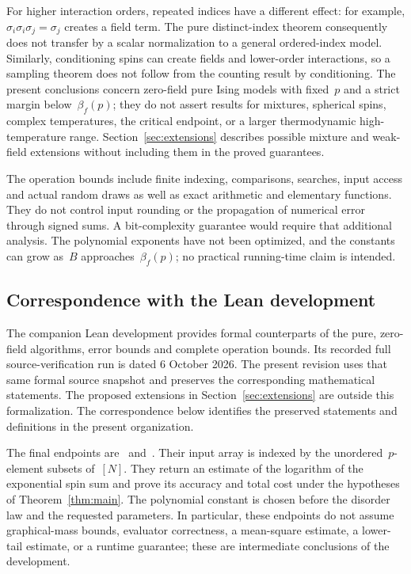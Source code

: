 \documentclass[10pt]{article}
\theoremstyle{plain}
\theoremstyle{definition}
\theoremstyle{remark}
\begin{document}
For higher interaction orders, repeated indices have a different effect: for example, $\sigma_i\sigma_i\sigma_j=\sigma_j$ creates a field term. The pure distinct-index theorem consequently does not transfer by a scalar normalization to a general ordered-index model. Similarly, conditioning spins can create fields and lower-order interactions, so a sampling theorem does not follow from the counting result by conditioning. The present conclusions concern zero-field pure Ising models with fixed~$p$ and a strict margin below~$\beta_f(p)$; they do not assert results for mixtures, spherical spins, complex temperatures, the critical endpoint, or a larger thermodynamic high-temperature range. Section~\ref{sec:extensions} describes possible mixture and weak-field extensions without including them in the proved guarantees.

The operation bounds include finite indexing, comparisons, searches, input access and actual random draws as well as exact arithmetic and elementary functions. They do not control input rounding or the propagation of numerical error through signed sums. A bit-complexity guarantee would require that additional analysis. The polynomial exponents have not been optimized, and the constants can grow as~$B$ approaches~$\beta_f(p)$; no practical running-time claim is intended.

\subsection{Correspondence with the Lean development}\label{app:formalization}
The companion Lean development provides formal counterparts of the pure, zero-field algorithms, error bounds and complete operation bounds. Its recorded full source-verification run is dated 6 October 2026. The present revision uses that same formal source snapshot and preserves the corresponding mathematical statements. The proposed extensions in Section~\ref{sec:extensions} are outside this formalization. The correspondence below identifies the preserved statements and definitions in the present organization.

The final endpoints are~ and~. Their input array is indexed by the unordered~$p$-element subsets of~$[N]$. They return an estimate of the logarithm of the exponential spin sum and prove its accuracy and total cost under the hypotheses of Theorem~\ref{thm:main}. The polynomial constant is chosen before the disorder law and the requested parameters. In particular, these endpoints do not assume graphical-mass bounds, evaluator correctness, a mean-square estimate, a lower-tail estimate, or a runtime guarantee; these are intermediate conclusions of the development.
\end{document}
